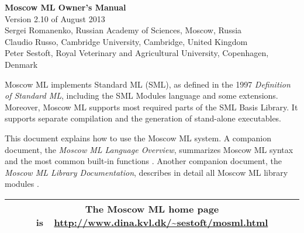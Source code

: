 \documentclass[fleqn,a4paper]{article}
\begin{document}
\begin{center}

  {\huge\bf Moscow ML Owner's Manual}\\[0.5cm]

Version 2.10 of August 2013\\[0.5cm]

Sergei Romanenko, Russian Academy of Sciences, Moscow, Russia\\
Claudio Russo, Cambridge University, Cambridge, United Kingdom\\
Peter Sestoft, Royal Veterinary and Agricultural University, 
Copenhagen, Denmark

\end{center}

\vspace{0.5cm}

\noindent 
Moscow ML implements Standard ML (SML), as defined in the 1997 {\em
  Definition of Standard ML\/}, including the SML Modules language
and some extensions.  Moreover, Moscow ML supports most required parts
of the SML Basis Library.  It supports separate compilation and the
generation of stand-alone executables.

This document explains how to use the Moscow ML system.  A companion
document, the {\em Moscow ML Language Overview\/}, summarizes Moscow
ML syntax and the most common built-in functions
\cite{MoscowML:2000:MoscowMLLanguage}.  Another companion document,
the \emph{Moscow ML Library Documentation}, describes in detail all
Moscow ML library modules \cite{MoscowML:2000:MoscowMLLibrary}. 

\vspace{0.5cm}

\tableofcontents

\vfill

\begin{center}
\begin{tabular}{|c|}\hline
\rule[-0.4cm]{0cm}{1cm}The Moscow ML home page is\ \
    \url{http://www.dina.kvl.dk/~sestoft/mosml.html}\\\hline
\end{tabular}
\end{center}
\end{document}
